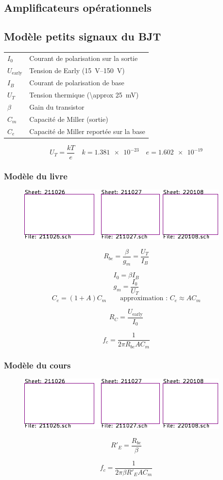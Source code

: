 \documentclass[resume]{subfiles}
\begin{document}
\begin{multicols}{3}
\section{Amplificateurs opérationnels}

\subsection{Modèle petits signaux du BJT}
\begin{center}
\begin{tabular}{ll}
$I_0$ & Courant de polarisation sur la sortie\\
$U_{\text{early}}$ & Tension de Early (\SIrange{15}{150}{\volt})\\
$I_B$ & Courant de polarisation de base\\
$U_T$ & Tension thermique (\SI{\approx 25}{\milli\volt})\\
$\beta$ & Gain du transistor\\
$C_m$ & Capacité de Miller (sortie)\\
$C_e$ & Capacité de Miller reportée sur la base
\end{tabular}
\end{center}
$$U_T=\frac{kT}{e}\quad k=\num{1.381e-23}\quad e=\num{1.602e-19}$$
\subsubsection{Modèle du livre}
\begin{figure}[H]
\centering
\includegraphics[scale=1,page=9]{../KiCad/resume-crop.pdf}
\end{figure}


$$R_{be}=\frac{\beta}{g_m}=\frac{U_T}{I_B}$$

$$I_0=\beta I_B$$
$$g_m=\frac{I_0}{U_T}$$
$$C_e=(1+A)C_m\qquad \text{approximation : } C_e\approx AC_m$$

$$R_C=\frac{U_{\text{early}}}{I_0}$$


$$f_c=\frac{1}{2\pi R_{be} A C_m}$$
\subsubsection{Modèle du cours}
\begin{figure}[H]
\centering
\includegraphics[scale=1,page=10]{../KiCad/resume-crop.pdf}
\end{figure}
$$R'_E=\frac{R_{be}}{\beta}$$

$$f_c=\frac{1}{2\pi \beta R'_E A C_m}$$
\end{multicols}
\end{document}
